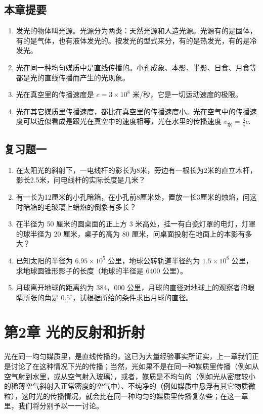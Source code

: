 \section{本章提要}

\begin{enumerate}
\item
  发光的物体叫光源。光源分为两类：天然光源和人造光源。光源有的是固体，有的是气体，也有液体发光的。按发光的型式来分，有的是热发光，有的是冷发光。
\item
  光在同一种均匀媒质中是直线传播的。小孔成象、本影、半影、日食、月食等都是光的直线传播而产生的光现象。
\item
  光在真空里的传播速度是 \(c = 3 \times 10^{8}\)
  米/秒，它是一切运动速度的极限。
\item
  光在其它媒质里传播速度，都比在真空里的传播速度小。光在空气中的传播速度可以近似看成是跟光在真空中的速度相等，光在水里的传播速度
  \(v_{\text{水}} = \frac{3}{4}c\).
\end{enumerate}

\section{复习题一}

\begin{enumerate}
\item
  在太阳光的斜射下，一电线杆的影长为8米，旁边有一根长为2米的直立木杆，影长2.5米，问电线杆的实际长度是几米？
\item
  有一长为12厘米的小孔暗箱，在小孔前8厘米处，置放一长3厘米的烛焰，问这时暗箱的毛玻璃上蜡焰的倒象有多长？
\item
  在半径为 50 厘米的圆桌面的正上方 3
  米高处，挂一有白瓷灯罩的电灯，灯罩的球半径为 20 厘米，桌子的高为 80
  厘米，问桌面投射在地面上的本影有多大？
\item
  已知太阳的半径为 \(6.95 \times 10^{5}\) 公里，地球公转轨道半径约为
  \(1.5 \times 10^{8}\) 公里，求地球圆锥形影子的长度（地球的半径是 6400
  公里）。
\item
  月球离开地球的距离约为 384，000
  公里，月球的直径对地球上的观察者的眼睛所张的角是
  \(0.5^{\circ}\)，试根据所给的条件求出月球的直径。
\end{enumerate}

\chapter{第2章
光的反射和折射}

光在同一均匀媒质里，是直线传播的，这已为大量经验事实所证实，上一章我们正是讨论了在这种情况下光的传播；当然，光如果不是在同一种媒质里传播（例如从空气射到水里，或从空气射入玻璃），或者，媒质是不均匀的（例如光从密度较小的稀薄空气斜射入正常密度的空气中）、不纯净的（例如媒质中悬浮有其它物质微粒），这时光的传播情况，就会比在同一种均匀的媒质里传播复杂些；在这一章里，我们将分别予以一一讨论。

